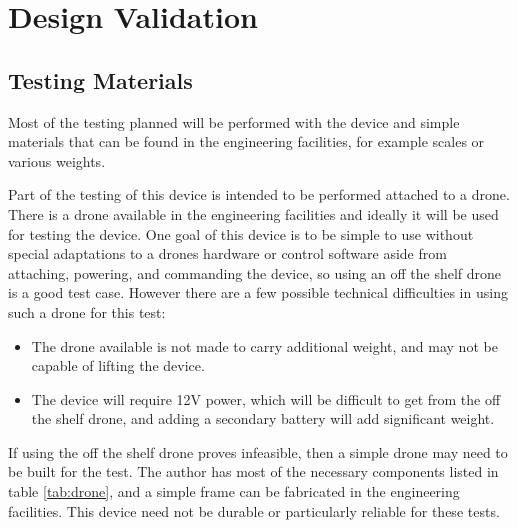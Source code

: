 \section{Design Validation}\label{sec:test}

\subsection{Testing Materials}
Most of the testing planned will be performed with the device and simple materials that can be found in the engineering facilities,
for example scales or various weights.

Part of the testing of this device is intended to be performed attached to a drone. There is a drone available in the engineering facilities and ideally it will be used for testing the device.
One goal of this device is to be simple to use without special adaptations to a drones hardware or control software aside from attaching, powering, and commanding the device,
so using an off the shelf drone is a good test case. However there are a few possible technical difficulties in using such a drone for this test:
\begin{itemize}
    \item The drone available is not made to carry additional weight, and may not be capable of lifting the device.
    \item The device will require 12V power, which will be difficult to get from the off the shelf drone, 
        and adding a secondary battery will add significant weight.
\end{itemize}

If using the off the shelf drone proves infeasible, then a simple drone may need to be built for the test. The author has most of the necessary components listed in table \ref{tab:drone},
and a simple frame can be fabricated in the engineering facilities. This device need not be durable or particularly reliable for these tests.

